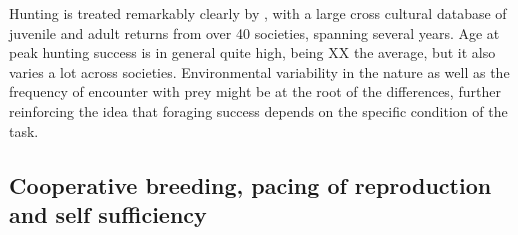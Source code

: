 Hunting is treated remarkably clearly by \cite{koster_life_2020}, with a large cross cultural database of juvenile and adult returns from over 40 societies, spanning several years. Age at peak hunting success is in general quite high, being XX the average, but it also varies a lot across societies. Environmental variability in the nature as well as the frequency of encounter with prey might be at the root of the differences, further reinforcing the idea that foraging success depends on the specific condition of the task.






\subsection{Cooperative breeding, pacing of reproduction and self sufficiency}


